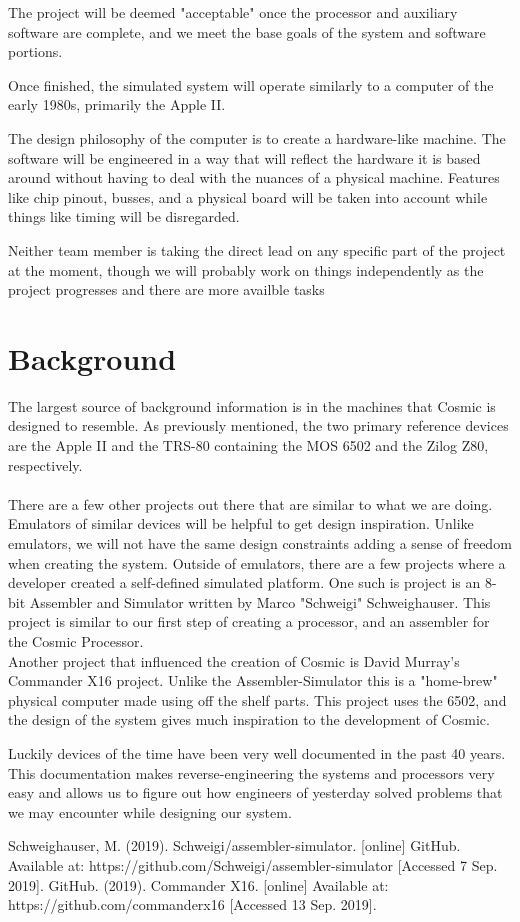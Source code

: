 \documentclass[conference]{IEEEtran}
\begin{document}
The project will be deemed "acceptable" once the processor and auxiliary software are complete, and we meet the base goals of the system and software portions.

Once finished, the simulated system will operate similarly to a computer of the early 1980s, primarily the Apple II. 

The design philosophy of the computer is to create a hardware-like machine. The software will be engineered in a way that will reflect the hardware it is based around without having to deal with the nuances of a physical machine. Features like chip pinout, busses, and a physical board will be taken into account while things like timing will be disregarded. 

Neither team member is taking the direct lead on any specific part of the project at the moment, though we will probably work on things independently as the project progresses and there are more availble tasks

\section{Background}

The largest source of background information is in the machines that Cosmic is designed to resemble. As previously mentioned, the two primary reference devices are the Apple II and the TRS-80 containing the MOS 6502 and the Zilog Z80, respectively. \\\\ There are a few other projects out there that are similar to what we are doing. Emulators of similar devices will be helpful to get design inspiration. Unlike emulators, we will not have the same design constraints adding a sense of freedom when creating the system.  Outside of emulators, there are a few projects where a developer created a self-defined simulated platform. One such is project is an 8-bit Assembler and Simulator written by Marco "Schweigi" Schweighauser\cite{b1}. This project is similar to our first step of creating a processor, and an assembler for the Cosmic Processor.\\ Another project that influenced the creation of Cosmic is David Murray's Commander X16 project\cite{b2}. Unlike the Assembler-Simulator this is a "home-brew" physical computer made using off the shelf parts. This project uses the 6502, and the design of the system gives much inspiration to the development of Cosmic.

    Luckily devices of the time have been very well documented in the past 40 years. This documentation makes
reverse-engineering the systems and processors very easy and allows us to figure out how
engineers of yesterday solved problems that we may encounter while designing our system. 


\begin{thebibliography}{00}
 Schweighauser, M. (2019). Schweigi/assembler-simulator. [online] GitHub. Available at: https://github.com/Schweigi/assembler-simulator [Accessed 7 Sep. 2019].
GitHub. (2019). Commander X16. [online] Available at: https://github.com/commanderx16 [Accessed 13 Sep. 2019].

\end{thebibliography}
\end{document}
